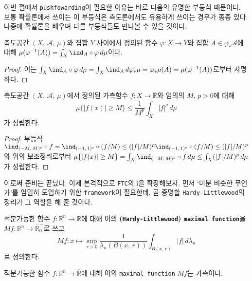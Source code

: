 이번 절에서 \texttt{pushfowarding}이 필요한 이유는 바로 다음의 유명한 부등식 때문이다. 보통 확률론에서 쓰이는 이 부등식은 측도론에서도 유용하게 쓰이는 경우가 종종 있다. 나중에 확률론을 배우며 다른 부등식들도 만나볼 수 있을 것이다.

\begin{lemma}
    측도공간 $(X,\,\mathcal{A},\,\mu)$와 집합 $Y$ 사이에서 정의된 함수 $\varphi:X\to Y$와 집합 $A\in\varphi_*\mathcal{A}$에 대해 $\mu(\varphi^{-1}(A))=\int_X\ind_A\circ\varphi\,d\mu$이다.
\end{lemma}

\begin{proof}
    이는 $\int_X\ind_A\circ\varphi\,d\mu=\int_X\ind_A\,d\varphi_*\mu=\varphi_*\mu(A)=\mu(\varphi^{-1}(A))$로부터 자명하다.
\end{proof}

\begin{theorem}
    측도공간 $(X,\,\mathcal{A},\,\mu)$에서 정의된 가측함수 $f:X\to\overline{\mathbb{R}}$와 임의의 $M,\,p>0$에 대해
    \begin{equation*}
        \mu\{|f(x)|\geq M\}\leq\frac{1}{M^p}\int_X|f|^p\,d\mu
    \end{equation*}
    가 성립한다.\footnotemark
\end{theorem}

\begin{proof}
    부등식 $\ind_{(-M,\,M)^c}\circ f=\ind_{(-1,\,1)^c}\circ(f/M)\leq(|f|/M)^p\ind_{(-1,\,1)^c}\circ(f/M)\leq(|f|/M)^p$와 위의 보조정리로부터 $\mu\{|f(x)|\geq M\}=\int_X\ind_{(-M,\,M)^c}\circ f\,d\mu\leq\int_X(|f|/M)^p\,d\mu$가 성립한다.
\end{proof}

이로써 준비는 끝났다. 이제 본격적으로 \texttt{FTC}의 i을 확장해보자. 먼저 `미분 비슷한 무언가'를 엄밀히 도입하기 위한 \texttt{framework}이 필요한데, 곧 증명할 \texttt{Hardy-Littlewood}의 정리가 그 역할을 해 줄 것이다.

\begin{definition}
    적분가능한 함수 $f:\mathbb{R}^n\to\overline{\mathbb{R}}$에 대해 이의 \textbf{(\texttt{Hardy-Littlewood}) \texttt{maximal function}}을 $Mf:\mathbb{R}^n\to\overline{\mathbb{R}}^+_0$로 쓰고
    \begin{equation*}
        Mf:x\mapsto\sup_{r>0}\frac{1}{\lambda_n(B(x,\,r))}\int_{B(x,\,r)}|f|\,d\lambda_n
    \end{equation*}
    로 정의한다.
\end{definition}

\begin{proposition}
    적분가능한 함수 $f:\mathbb{R}^n\to\overline{\mathbb{R}}$에 대해 이의 \texttt{maximal function} $Mf$는 가측이다.
\end{proposition}

